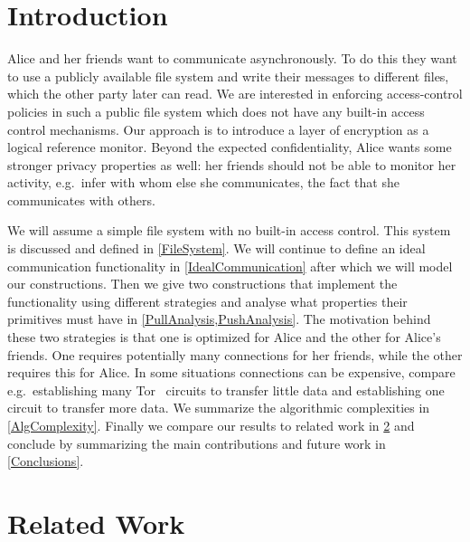 \acresetall{}
\section{Introduction}\label{Introduction}

Alice and her friends want to communicate asynchronously.
To do this they want to use a publicly available file system and write their 
messages to different files, which the other party later can read.
We are interested in enforcing access-control policies in such a public file 
system which does not have any built-in access control mechanisms.
Our approach is to introduce a layer of encryption as a logical reference 
monitor.
Beyond the expected confidentiality, Alice wants some stronger privacy 
properties as well: her friends should not be able to monitor her activity, 
e.g.\ infer with whom else she communicates, the fact that she communicates 
with others.

We will assume a simple file system with no built-in access control.
This system is discussed and defined in \cref{FileSystem}.
We will continue to define an ideal communication functionality in 
\cref{IdealCommunication} after which we will model our constructions.
Then we give two constructions that implement the functionality using different 
strategies and analyse what properties their primitives must have in 
\cref{PullAnalysis,PushAnalysis}.
The motivation behind these two strategies is that one is optimized for Alice 
and the other for Alice's friends.
One requires potentially many connections for her friends, while the other 
requires this for Alice.
In some situations connections can be expensive, compare e.g.\ establishing 
many Tor~\cite{Tor} circuits to transfer little data and establishing one 
circuit to transfer more data.
We summarize the algorithmic complexities in \cref{AlgComplexity}.
Finally we compare our results to related work in \cref{RelatedWork} and 
conclude by summarizing the main contributions and future work in 
\cref{Conclusions}.









\section{Related Work}\label{RelatedWork}

